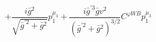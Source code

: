 %
\begin{dmath*}
%
  +  \frac{i {\bar g}{}^2}{\sqrt{{\bar g}^{\prime 2} + {\bar g}{}^2}}p_1^{\mu_3}  +  \frac{i {\bar g}^{\prime 3} {\bar g}{} v^2}{\left({\bar g}^{\prime 2} + {\bar g}{}^2\right)^{3/2}}C^{ \varphi  WB} p_1^{\mu_3}
%
\end{dmath*}
%
